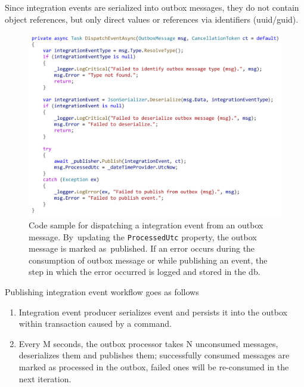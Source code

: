 Since integration events are serialized into outbox messages, they do not contain object references, but only direct values or references via identifiers (uuid/guid).

\begin{figure} [H]
    \centering
    \includegraphics[width=\textwidth]{figures/dispatch-integration.pdf}
    \caption{Code sample for dispatching a integration event from an outbox message. By~updating the \texttt{ProcessedUtc} property, the outbox message is marked as~published. If an error occurs during the consumption of outbox message or while publishing an event, the step in which the error occurred is logged and stored in the db.}
    \label{fig:dispatch_integration_events}
\end{figure}

Publishing integration event workflow goes as follows 
\begin{enumerate}
    \item Integration event producer serializes event and persists it into the outbox within transaction caused by a command.
    \item Every M seconds, the outbox processor takes N unconsumed messages, deserializes them and publishes them; successfully consumed messages are marked as processed in the outbox, failed ones will be re-consumed in the next iteration.
\end{enumerate}

\newpage
